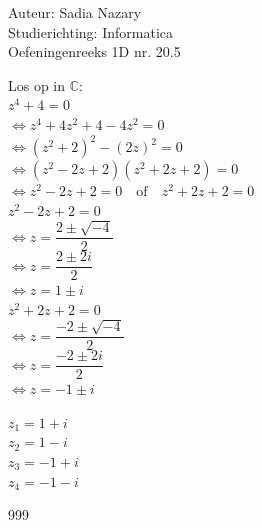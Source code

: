 \documentclass[a4paper]{article}
\begin{document}
  
\noindent \large Auteur: Sadia Nazary  \\
\noindent \large Studierichting: Informatica\\
\noindent \large Oefeningenreeks 1D nr. 20.5\\

\medskip

\normalsize

Los op in $\mathbb{C}$:\\

$z^4 + 4 = 0$ \\

$\Leftrightarrow z^4 + 4z^2 + 4 - 4z^2 = 0$ \\

$\Leftrightarrow (z^2+2)^2 - (2z)^2 = 0$ \\

$\Leftrightarrow (z^2 - 2z + 2)(z^2 + 2z + 2) = 0$ \\

$\Leftrightarrow z^2 - 2z + 2 = 0 \quad \mathrm{of} \quad z^2 + 2z + 2 = 0$ \\

$z^2 - 2z + 2 = 0$ \\

$\Leftrightarrow z = \dfrac{2 \pm \sqrt{-4}}{2}$ \\

$\Leftrightarrow z = \dfrac{2 \pm 2i}{2}$ \\

$\Leftrightarrow z = 1 \pm i$ \\

$z^2 + 2z + 2 = 0$ \\

$\Leftrightarrow z = \dfrac{-2 \pm \sqrt{-4}}{2}$ \\

$\Leftrightarrow z = \dfrac{-2 \pm 2i}{2}$ \\

$\Leftrightarrow z = -1 \pm i$ \\

\medskip

$z_1 = 1 + i$ \\

$z_2 = 1 - i$ \\

$z_3 = -1 + i$ \\

$z_4 = -1 - i$ \\

\begin{thebibliography}{999}
\end{thebibliography}
\end{document}
